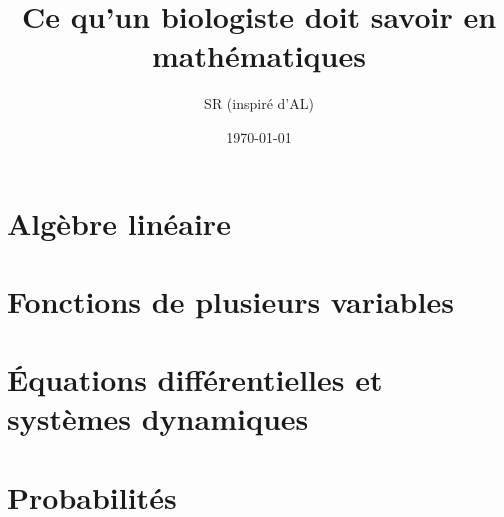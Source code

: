 \documentclass[french, 12pt]{article}
\title{\Huge{Ce qu'un biologiste doit savoir en mathématiques}}
\author{SR (inspiré d'AL)}
\date{\today}
\numberwithin{exercise}{section}
\numberwithin{equation}{section}
\begin{document}

\maketitle
\tableofcontents

\newpage 
\section{Algèbre linéaire}


\newpage 
\section{Fonctions de plusieurs variables}


\newpage 
\section{\'Equations différentielles et systèmes dynamiques}


\newpage 
\section{Probabilités}


% 
% 

\end{document}

